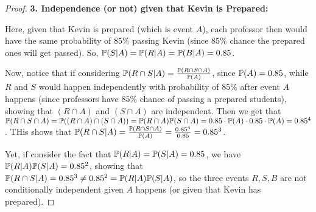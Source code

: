 \documentclass{article}
\begin{document}
\begin{proof}
    \hfil

    \textbf{3. Independence (or not) given that Kevin is Prepared:}

    Here, given that Kevin is prepared (which is event $A$), each professor then would have the same probability of $85\%$ passing Kevin (since $85\%$ chance the prepared ones will get passed). So, $\mathbb{P}(S|A)=\mathbb{P}(R|A)=\mathbb{P}(B|A)=0.85$.

    Now, notice that if considering $\mathbb{P}(R\cap S|A) = \frac{\mathbb{P}(R\cap S\cap A)}{\mathbb{P}(A)}$, since $\mathbb{P}(A)=0.85$, while $R$ and $S$ would happen independently with probability of $85\%$ after event $A$ happens (since professors have $85\%$ chance of passing a prepared students), showing that $(R\cap A)$ and $(S\cap A)$ are independent. Then we get that $\mathbb{P}(R\cap S\cap A)=\mathbb{P}((R\cap A)\cap (S\cap A))=\mathbb{P}(R\cap A)\mathbb{P}(S\cap A) = 0.85\cdot \mathbb{P}(A)\cdot 0.85\cdot \mathbb{P}(A) = 0.85^4$. THis shows that $\mathbb{P}(R\cap S|A)=\frac{\mathbb{P}(R\cap S\cap A)}{\mathbb{P}(A)}=\frac{0.85^4}{0.85}=0.85^3$.

    Yet, if consider the fact that $\mathbb{P}(R|A)=\mathbb{P}(S|A)=0.85$, we have $\mathbb{P}(R|A)\mathbb{P}(S|A)=0.85^2$, showing that $\mathbb{P}(R\cap S|A) = 0.85^3\neq 0.85^2=\mathbb{P}(R|A)\mathbb{P}(S|A)$, so the three events $R,S,B$ are not conditionally independent given $A$ happens (or given that Kevin has prepared).
\end{proof}
\end{document}
